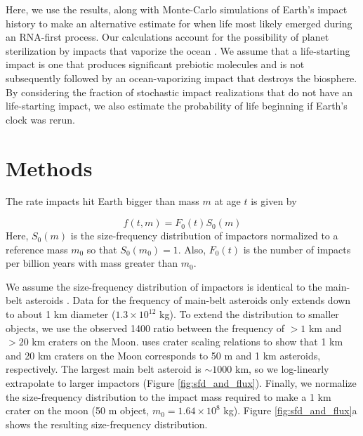 \documentclass[preprint]{aastex63}
\begin{document}
Here, we use the \citet{Wogan_2023} results, along with Monte-Carlo simulations of Earth's impact history to make an alternative estimate for when life most likely emerged during an RNA-first process. Our calculations account for the possibility of planet sterilization by impacts that vaporize the ocean \citep{Sleep_1989}. We assume that a life-starting impact is one that produces significant prebiotic molecules and is not subsequently followed by an ocean-vaporizing impact that destroys the biosphere. By considering the fraction of stochastic impact realizations that do not have an life-starting impact, we also estimate the probability of life beginning if Earth's clock was rerun.

\section{Methods} \label{sec:methods}
The rate impacts hit Earth bigger than mass $m$ at age $t$ is given by

\begin{equation}
  f(t,m) = F_0(t) S_0(m)
\end{equation}
Here, $S_0(m)$ is the size-frequency distribution of impactors normalized to a reference mass $m_0$ so that $S_0(m_0) = 1$. Also, $F_0(t)$ is the number of impacts per billion years with mass greater than $m_0$.

We assume the size-frequency distribution of impactors is identical to the main-belt asteroids \citep[Extended Data Figure 1,][]{Marchi_2014}. Data for the frequency of main-belt asteroids only extends down to about 1 km diameter ($1.3 \times 10^{12} $ kg). To extend the distribution to smaller objects, we use the observed 1400 ratio between the frequency of $> 1$ km and $> 20$ km craters on the Moon. \citet{Morbidelli_2018} uses crater scaling relations to show that 1 km and 20 km craters on the Moon corresponds to 50 m and 1 km asteroids, respectively. The largest main belt asteroid is $\sim 1000$ km, so we log-linearly extrapolate to larger impactors (Figure \ref{fig:sfd_and_flux}). Finally, we normalize the size-frequency distribution to the impact mass required to make a 1 km crater on the moon (50 m object, $m_0 = 1.64 \times 10^{8}$ kg). Figure \ref{fig:sfd_and_flux}a shows the resulting size-frequency distribution.
\end{document}
